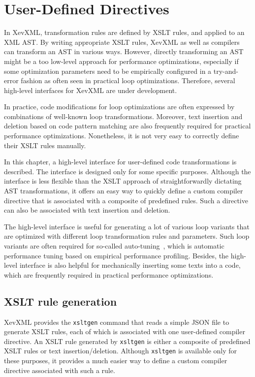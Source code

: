 \chapter{User-Defined Directives}\label{chap:json}


In XevXML, transformation rules are defined by XSLT rules, and applied
to an XML AST. By writing appropriate XSLT rules, XevXML as well as
compilers can transform an AST in various ways.  However, directly
transforming an AST might be a too low-level approach for performance
optimizations, especially if some optimization parameters need to be
empirically configured in a try-and-error fashion as often seen in
practical loop optimizations.  Therefore, several high-level interfaces
for XevXML are under development.

In practice, code modifications for loop optimizations are often
expressed by combinations of well-known loop transformations.  Moreover,
text insertion and deletion based on code pattern matching are also
frequently required for practical performance optimizations.
Nonetheless, it is not very easy to correctly define their XSLT rules
manually.

In this chapter, a high-level interface for user-defined code
transformations is described. The interface is designed only for some
specific purposes.  Although the interface is less flexible than the
XSLT approach of straightforwardly dictating AST transformations, it
offers an easy way to quickly define a custom compiler directive that is
associated with a composite of predefined rules. Such a directive can
also be associated with text insertion and deletion. 

The high-level interface is useful for generating a lot of various loop
variants that are optimized with different loop transformation rules and
parameters. Such loop variants are often required for so-called
auto-tuning~\cite{autotuning}, which is automatic performance tuning
based on empirical performance profiling.  Besides, the high-level
interface is also helpful for mechanically inserting some texts into a
code, which are frequently required in practical performance
optimizations.

\section{XSLT rule generation}
XevXML provides the \texttt{xsltgen} command that reads a simple
JSON\cite{json} file to generate XSLT rules, each of which is associated
with one user-defined compiler directive.  An XSLT rule generated by
\texttt{xsltgen} is either a composite of predefined XSLT rules or text
insertion/deletion.  Although \texttt{xsltgen} is available only for
these purposes, it provides a much easier way to define a custom
compiler directive associated with such a rule.

